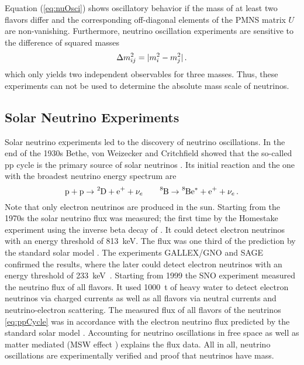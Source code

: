     Equation (\ref{eq:nuOsci}) shows oscillatory behavior if the mass of at least two flavors differ and the corresponding off-diagonal elements of the PMNS matrix $U$ are non-vanishing. Furthermore, neutrino oscillation experiments are sensitive to the difference of squared masses 
    \begin{equation}
        \label{eq:massSquaredDiff}
        \Delta m^2_{ij} =  \lvert m^2_i - m^2_j\rvert \text{\,.}
    \end{equation}
    which only yields two independent observables for three masses. Thus, these experiments can not be used to determine the absolute mass scale of neutrinos.
    
    \subsection{Solar Neutrino Experiments}
    Solar neutrino experiments led to the discovery of neutrino oscillations. In the end of the 1930s Bethe, von Weizecker and Critchfield showed that the so-called pp cycle is the primary source of solar neutrinos \cite{Weiz1938, Bethe38, Bethe39}. Its initial reaction and the one with the broadest neutrino energy spectrum are
    \begin{equation}
        \ce{p} + \ce{p} \rightarrow \ce{^2D} + \ce{e^+} + \nu_e
        \qquad
        \ce{^8B} \rightarrow \ce{^8Be^*} + \ce{e^+} + \nu_e \fullstop
        \label{eq:ppCycle}
    \end{equation}
    Note that only electron neutrinos are produced in the sun. Starting from the 1970s the solar neutrino flux was measured; the first time by the Homestake experiment using the inverse beta decay of . It could detect electron neutrinos with an energy threshold of \SI{813}{keV}. The flux was one third of the prediction by the standard solar model \cite{Cleveland1998}. The experiments GALLEX/GNO and SAGE confirmed the results, where the later could detect electron neutrinos with an energy threshold of \SI{233}{keV}~\cite{Kirsten1998, Altmann2005, Abdurashitov2009}. Starting from 1999 the SNO experiment measured the neutrino flux of all flavors. It used \SI{1000}{t} of heavy water  to detect electron neutrinos via charged currents as well as all flavors via neutral currents and neutrino-electron scattering. The measured flux of all flavors of the  neutrinos \eqref{eq:ppCycle} was in accordance with the electron neutrino flux predicted by the standard solar model \cite{Aharmim2013}. Accounting for neutrino oscillations in free space as well as matter mediated (MSW effect \cite{Wolfenstein1977, Mikheev1986}) explains the flux data. All in all, neutrino oscillations are experimentally verified and proof that neutrinos have mass.
    
